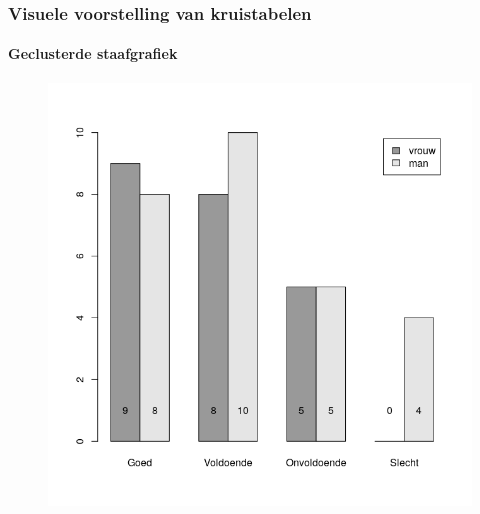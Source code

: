 \documentclass[aspectratio=169]{beamer}
\begin{document}
\begin{frame}
  \frametitle{Visuele voorstelling van kruistabelen}
  \framesubtitle{Geclusterde staafgrafiek}

  \begin{figure}
    \centering
    \includegraphics[height=.9\textheight]{img/2var-staafgrafiek-geclusterd}
  \end{figure}

\end{frame}
\end{document}
